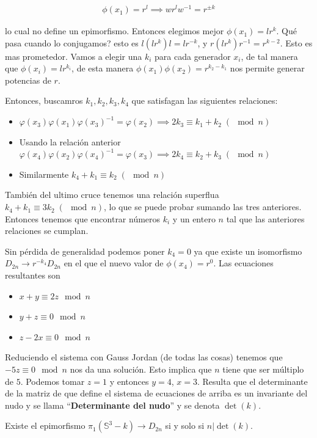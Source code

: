 \documentclass{article}
\theoremstyle{mytheoremstyle}
\theoremstyle{mytheoremstyle}
\theoremstyle{myproblemstyle}
\begin{document}
\begin{align}
 \phi(x_1)=r^l \implies w r^l w^{-1}= r^{\pm k}
\end{align}

lo cual no define un epimorfismo. Entonces elegimos mejor $\phi(x_1)=lr^k$. Qué pasa cuando lo conjugamos? esto es $l(lr^k)l=lr^{-k}$, y $r(lr^k)r^{-1}=r^{k-2}$. Esto es mas prometedor. Vamos a elegir una $k_i$ para cada generador $x_i$, de tal manera que $\phi(x_i)=lr^{k_i}$, de esta manera $\phi(x_1)\phi(x_2)=r^{k_2-k_1}$ nos permite generar potencias de $r$.

Entonces, buscamros $k_1,k_2,k_3,k_4$ que satisfagan las siguientes relaciones:
\begin{itemize}
  \item $\varphi(x_3)\varphi(x_1)\varphi(x_3)^{-1}=\varphi(x_2) \implies 2k_3\equiv k_1+ k_2\; (\mod n)$ 
  \item Usando la relación anterior $\varphi(x_4)\varphi(x_2)\varphi(x_4)^{-1}=\varphi(x_3) \implies 2k_4\equiv k_2+ k_3\; (\mod n)$ 
  \item Similarmente $k_4+k_1 \equiv  k_2\;(\mod n)$ 
\end{itemize}
También del ultimo cruce tenemos una relación superflua $k_4+k_1 \equiv 3k_2\; (\mod n)$, lo que se puede probar sumando las tres anteriores. Entonces tenemos que encontrar números $k_i$ y un entero $n$ tal que las anteriores relaciones se cumplan. 

Sin pérdida de generalidad podemos poner $k_4=0$ ya que existe un isomorfismo $D_{2n} \to r^{-k_4} D_{2n}$ en el que el nuevo valor de $\phi(x_4)=r^0$. Las ecuaciones resultantes son 
\begin{itemize}
  \item $x+y \equiv 2z \mod n$
  \item $y+z\equiv 0 \mod n $
  \item $z-2x\equiv 0 \mod n$
\end{itemize}
Reduciendo el sistema con Gauss Jordan (de todas las cosas) tenemos que $-5z\equiv 0 \mod n$ nos da una solución. Esto implica que $n$ tiene que ser múltiplo de $5$. Podemos tomar $z=1$ y entonces $y=4$, $x=3$. Resulta que el determinante de la matriz de que define el sistema de ecuaciones de arriba es un invariante del nudo y se llama ``\textbf{Determinante del nudo}'' y se denota $\det (k)$.

\begin{theorem}[]
  Existe el epimorfismo $\pi_1 (\mathbb{S}^3- k)\to D_{2n}$ si y solo si $n|\det(k)$.
\end{theorem}
\end{document}
